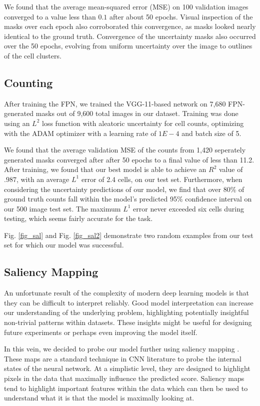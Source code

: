 \documentclass[10pt,twocolumn,letterpaper]{article}
\begin{document}
We found that the average mean-squared error (MSE) on 100 validation images converged to a value less than $0.1$ after about 50 epochs.
Visual inspection of the masks over each epoch also corroborated this convergence, as masks looked nearly identical to the ground truth.
Convergence of the uncertainty masks also occurred over the 50 epochs, evolving from uniform uncertainty over the image to outlines of the cell clusters.


\subsection{Counting}

After training the FPN, we trained the VGG-11-based network on 7,680 FPN-generated masks out of 9,600 total images in our dataset.
Training was done using an $L^2$ loss function with aleatoric uncertainty for cell counts, optimizing with the ADAM optimizer with a learning rate of $1E-4$ and batch size of 5.

We found that the average validation MSE of the counts from 1,420 seperately generated masks converged after after 50 epochs
to a final value of less than 11.2.
After training, we found that our best model is able to achieve an $R^2$ value of $.987$, with an average $L^1$ error of 2.4 cells, on our test set. Furthermore, when considering the uncertainty predictions of our model, we find that over 80\% of ground truth counts fall within the model's predicted 95\% confidence interval on our 500 image test set. The maximum $L^1$ error never exceeded six cells during testing, which seems fairly accurate for the task.

Fig. \ref{fig_sal} and Fig. \ref{fig_sal2} demonstrate two random examples from our test set for which our model was successful.


\subsection{Saliency Mapping}
An unfortunate result of the complexity of modern deep learning models is that they can be difficult to interpret reliably. Good model interpretation can increase our understanding of the underlying problem, highlighting potentially insightful non-trivial patterns within datasets. These insights might be useful for designing future experiments or perhaps even improving the model itself.  

In this vein, we decided to probe our model further using saliency mapping \cite{saliency}. These maps are a standard technique in CNN literature to probe the internal states of the neural network. At a simplistic level, they are designed to highlight pixels in the data that maximally influence the predicted score. Saliency maps tend to highlight important features within the data which can then be used to understand what it is that the model is maximally looking at. 
\end{document}
